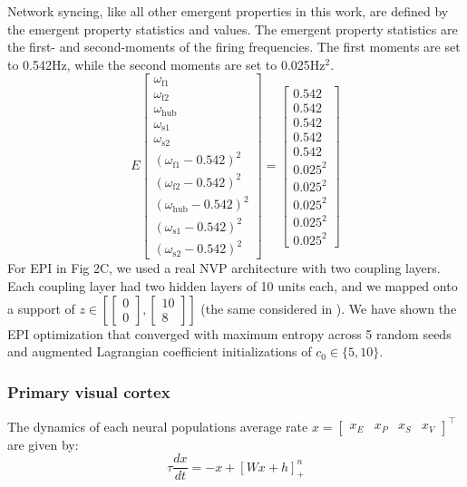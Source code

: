 \documentclass[11pt]{article}
\begin{document}
Network syncing, like all other emergent properties in this work, are defined by the emergent property statistics and values.  The emergent property statistics are the first- and second-moments of the firing frequencies. The first moments are set to 0.542Hz, while the second moments are set to 0.025Hz$^2$.
\begin{equation}
E \begin{bmatrix} \omega_{\text{f1}} \\ \omega_{\text{f2}} \\ \omega_{\text{hub}} \\ \omega_{\text{s1}} \\ \omega_{\text{s2}} \\ (\omega_{\text{f1}} - 0.542)^2 \\ (\omega_{\text{f2}} - 0.542)^2 \\ (\omega_{\text{hub}} - 0.542)^2 \\ (\omega_{\text{s1}} - 0.542)^2 \\ (\omega_{\text{s2}} - 0.542)^2  \end{bmatrix} = \begin{bmatrix} 0.542 \\ 0.542 \\ 0.542 \\ 0.542 \\ 0.542 \\ 0.025^2 \\ 0.025^2 \\ 0.025^2 \\ 0.025^2 \\ 0.025^2 \end{bmatrix}
\end{equation}
For EPI in Fig 2C, we used a real NVP architecture with two coupling layers.  Each coupling layer had two hidden layers of 10 units each, and we mapped onto a support of $z \in \left[ \begin{bmatrix} 0 \\ 0 \end{bmatrix}, \begin{bmatrix} 10 \\ 8 \end{bmatrix} \right]$ (the same considered in \cite{gutierrez2013multiple}). We have shown the EPI optimization that converged with maximum entropy across 5 random seeds and augmented Lagrangian coefficient initializations of $c_0 \in \{5, 10\}$.

\subsubsection{Primary visual cortex}\label{methods_V1}
The dynamics of each neural populations average rate
$x = \begin{bmatrix} x_E & x_P & x_S & x_V \end{bmatrix}^\top$
are given by:
\begin{equation}
\tau \frac{dx}{dt} = -x + [W x+ h]_+^n
\end{equation}
\end{document}
